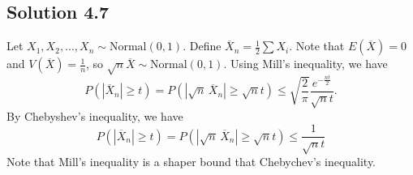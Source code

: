 \subsection*{Solution 4.7}

Let $X_1, X_2, ..., X_n \sim \mathrm{Normal}(0, 1)$.
Define $\overline{X}_n = \frac{1}{2} \sum X_i$.
Note that $E(\overline{X}) = 0$ and $V(\overline{X}) = \frac{1}{n}$, so $\sqrt{n}\overline{X} \sim \mathrm{Normal}(0, 1)$.
Using Mill's inequality, we have
\begin{equation*}
    P(|\overline{X}_n| \geq t) = P(|\sqrt{n}\,\overline{X}_n| \geq \sqrt{n}t)
        \leq \sqrt{\frac{2}{\pi}} \frac{e^{-\frac{nt}{2}}}{\sqrt{n}t}.
\end{equation*}
By Chebyshev's inequality, we have
\begin{equation*}
    P(|\overline{X}_n| \geq t) = P(|\sqrt{n}\,\overline{X}_n| \geq \sqrt{n}t)
        \leq \frac{1}{\sqrt{n}t}
\end{equation*}
Note that Mill's inequality is a shaper bound that Chebychev's inequality.
